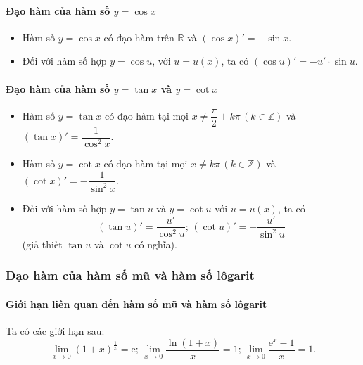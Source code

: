 \paragraph{Đạo hàm của hàm số $y=\cos x$}
\begin{dl} 
	\begin{itemize}
	\item Hàm số $y=\cos x$ có đạo hàm trên $\mathbb{R}$ và $\left(\cos x\right)'=-\sin x$.
	\item Đối với hàm số hợp $y=\cos u$, với $u=u(x)$, ta có $(\cos u)'=-u'\cdot \sin u$. 
	\end{itemize}
\end{dl}
\paragraph{Đạo hàm của hàm số $y=\tan x$ và $y=\cot x$}
\begin{dl} 
	\begin{itemize}
	\item Hàm số $y=\tan x$ có đạo hàm tại mọi $x\neq \dfrac{\pi}{2}+k\pi\,\left(k\in \mathbb{Z}\right)$ và $\left(\tan x\right)'=\dfrac{1}{\cos ^2 x}.$
	\item Hàm số $y=\cot x$ có đạo hàm tại mọi $x\neq k\pi\,\left(k\in \mathbb{Z}\right)$ và $\left(\cot x\right)'=-\dfrac{1}{\sin ^2 x}.$
	\item Đối với hàm số hợp $y=\tan u$ và $y=\cot u$ với $u=u(x)$, ta có 
	$$(\tan u)'=\dfrac{u'}{\cos^2u}; \, (\cot u)'=-\dfrac{u'}{\sin^2u}$$
	(giả thiết $\tan u$ và $\cot u$ có nghĩa).
	\end{itemize}
\end{dl}
\subsubsection{Đạo hàm của hàm số mũ và hàm số lôgarit}
\paragraph{Giới hạn liên quan đến hàm số mũ và hàm số lôgarit}
\begin{nx}
	Ta có các giới hạn sau:$$\lim\limits_{x \to 0}\left(1+x\right)^{\frac{1}{x}}=\mathrm{e};\,\lim\limits_{x \to 0}\dfrac{\ln(1+x)}{x}=1;\,\lim\limits_{x \to 0}\dfrac{\mathrm{e}^x-1}{x}=1.$$
\end{nx}
